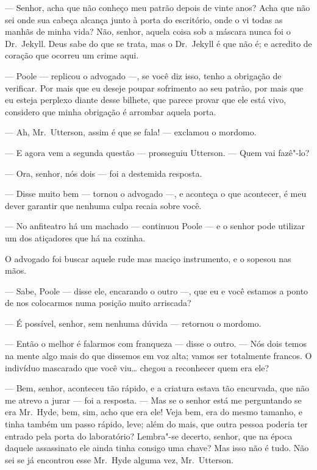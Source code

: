 --- Senhor, acha que não conheço meu patrão depois de vinte anos?  Acha
que não sei onde sua cabeça alcança junto à porta do escritório, onde o
vi todas as manhãs de minha vida?  Não, senhor, aquela coisa sob a
máscara nunca foi o Dr.~Jekyll.  Deus sabe do que se trata, mas o Dr.~Jekyll 
é que não é; e acredito de coração que ocorreu um crime aqui.

--- Poole --- replicou o advogado ---, se você diz isso, tenho a obrigação de
verificar.  Por mais que eu deseje poupar sofrimento ao seu patrão, por
mais que eu esteja perplexo diante desse bilhete, que parece provar que
ele está vivo, considero que minha obrigação é arrombar aquela porta.

--- Ah, Mr.~Utterson, assim é que se fala! --- exclamou o mordomo. 

--- E agora vem a segunda questão --- prosseguiu Utterson. --- Quem vai
fazê"-lo?

--- Ora, senhor, nós dois --- foi a destemida resposta.

--- Disse muito bem --- tornou o advogado ---, e aconteça o que acontecer, é
meu dever garantir que nenhuma culpa recaia sobre você.

--- No anfiteatro há um machado --- continuou Poole --- e o senhor pode
utilizar um dos atiçadores que há na cozinha.

O advogado foi buscar aquele rude mas maciço instrumento, e o sopesou
nas mãos.

--- Sabe, Poole --- disse ele, encarando o outro ---, que eu e você estamos
a ponto de nos colocarmos numa posição muito arriscada?

--- É possível, senhor, sem nenhuma dúvida --- retornou o mordomo.

--- Então o melhor é falarmos com franqueza --- disse o outro. --- Nós dois
temos na mente algo mais do que dissemos em voz alta; vamos ser
totalmente francos.  O indivíduo mascarado que você viu\ldots{} chegou a
reconhecer quem era ele?

--- Bem, senhor, aconteceu tão rápido, e a criatura estava tão
encurvada, que não me atrevo a jurar --- foi a resposta. --- Mas se o senhor
está me perguntando se era Mr.~Hyde, bem, sim, acho que era ele!  Veja
bem, era do mesmo tamanho, e tinha também um passo rápido, leve; além
do mais, que outra pessoa poderia ter entrado pela porta do
laboratório?  Lembra"-se decerto, senhor, que na época daquele
assassinato ele ainda tinha consigo uma chave?  Mas isso não é tudo. 
Não sei se já encontrou esse Mr.~Hyde alguma vez, Mr.~Utterson.

